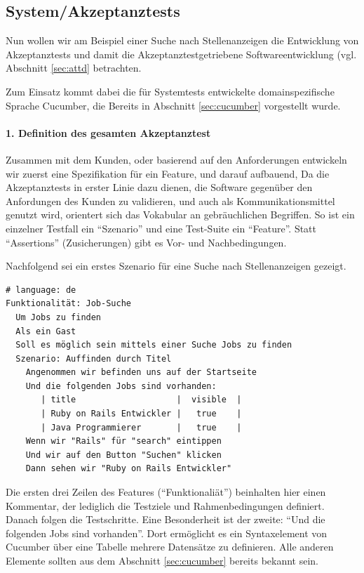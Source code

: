 \subsection{System/Akzeptanztests}
\label{sec:system}

Nun wollen wir am Beispiel einer Suche nach Stellenanzeigen die Entwicklung von Akzeptanztests und damit die Akzeptanztestgetriebene Softwareentwicklung (vgl. Abschnitt \ref{sec:attd} betrachten.

Zum Einsatz kommt dabei die für Systemtests entwickelte domainspezifische Sprache Cucumber, die Bereits in Abschnitt \ref{sec:cucumber} vorgestellt wurde.


\paragraph{1. Definition des gesamten Akzeptanztest}

Zusammen mit dem Kunden, oder basierend auf den Anforderungen entwickeln wir zuerst eine Spezifikation für ein Feature, und darauf aufbauend, Da die Akzeptanztests in erster Linie dazu dienen, die Software gegenüber den Anfordungen des Kunden zu validieren, und auch als Kommunikationsmittel genutzt wird, orientert sich das Vokabular an gebräuchlichen Begriffen. So ist ein einzelner Testfall ein "`Szenario"' und eine Test-Suite ein "`Feature"'. Statt "`Assertions"' (Zusicherungen) gibt es Vor- und Nachbedingungen.

Nachfolgend sei ein erstes Szenario für eine Suche nach Stellenanzeigen gezeigt.

\begin{lstlisting}
# language: de
Funktionalität: Job-Suche
  Um Jobs zu finden
  Als ein Gast
  Soll es möglich sein mittels einer Suche Jobs zu finden    
  Szenario: Auffinden durch Titel
    Angenommen wir befinden uns auf der Startseite
    Und die folgenden Jobs sind vorhanden:
       | title                    |  visible  |
       | Ruby on Rails Entwickler |   true    |
       | Java Programmierer       |   true    |
    Wenn wir "Rails" für "search" eintippen
    Und wir auf den Button "Suchen" klicken
    Dann sehen wir "Ruby on Rails Entwickler"
\end{lstlisting}

Die ersten drei Zeilen des Features ("`Funktionaliät"') beinhalten hier einen Kommentar, der lediglich die Testziele und Rahmenbedingungen definiert. Danach folgen die Testschritte. Eine Besonderheit ist der zweite: "`Und die folgenden Jobs sind vorhanden"'. Dort ermöglicht es ein Syntaxelement von Cucumber über eine Tabelle mehrere Datensätze zu definieren. Alle anderen Elemente sollten aus dem Abschnitt \ref{sec:cucumber} bereits bekannt sein.

